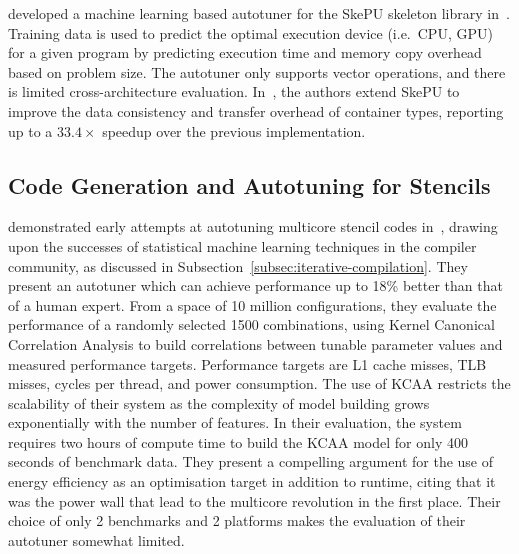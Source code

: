 \documentclass[nonatbib,preprint,10pt]{sigplanconf}
\begin{document}
\citeauthor{Dastgeer2011} developed a machine learning based autotuner
for the SkePU skeleton library in~\cite{Dastgeer2011}. Training data
is used to predict the optimal execution device (i.e.\ CPU, GPU) for a
given program by predicting execution time and memory copy overhead
based on problem size. The autotuner only supports vector operations,
and there is limited cross-architecture
evaluation. In~\cite{Dastgeer2015a}, the authors extend SkePU to
improve the data consistency and transfer overhead of container types,
reporting up to a $33.4\times$ speedup over the previous
implementation.


\subsection{Code Generation and Autotuning for Stencils}


\citeauthor{Ganapathi2009} demonstrated early attempts at autotuning
multicore stencil codes in~\cite{Ganapathi2009}, drawing upon the
successes of statistical machine learning techniques in the compiler
community, as discussed in
Subsection~\ref{subsec:iterative-compilation}. They present an autotuner
which can achieve performance up to 18\% better than that of a human
expert. From a space of 10 million configurations, they evaluate the
performance of a randomly selected 1500 combinations, using Kernel
Canonical Correlation Analysis to build correlations between tunable
parameter values and measured performance targets. Performance targets
are L1 cache misses, TLB misses, cycles per thread, and power
consumption. The use of KCAA restricts the scalability of their system
as the complexity of model building grows exponentially with the
number of features. In their evaluation, the system requires two hours
of compute time to build the KCAA model for only 400 seconds of
benchmark data. They present a compelling argument for the use of
energy efficiency as an optimisation target in addition to runtime,
citing that it was the power wall that lead to the multicore
revolution in the first place. Their choice of only 2 benchmarks and 2
platforms makes the evaluation of their autotuner somewhat limited.
\end{document}
